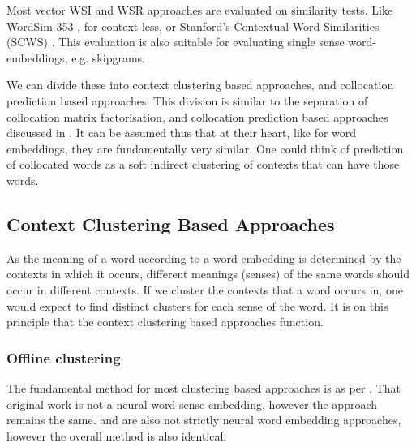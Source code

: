 \documentclass[12pt,parskip]{komatufte}
\begin{document}
Most vector WSI and WSR approaches are evaluated on similarity tests.
Like WordSim-353 \textcite{WordSim353}, for context-less, or Stanford's Contextual Word Similarities (SCWS) \textcite{Huang2012}.
This evaluation is also suitable for evaluating single sense word-embeddings, e.g. skipgrams.


We can divide these into context clustering based approaches,
and collocation prediction based approaches.
This division is similar to the separation of collocation matrix factorisation,
and collocation prediction based approaches discussed in .
It can be assumed thus that at their heart, like for word embeddings,
they are fundamentally very similar.
One could think of prediction of collocated words as a soft indirect clustering of contexts that can have those words.


\subsection{Context Clustering Based Approaches}
As the meaning of a word according to a word embedding is determined by the contexts in which it occurs, different meanings (senses) of the same words should occur in different contexts.
If we cluster the contexts that a word occurs in, one would expect to find distinct clusters for each sense of the word.
It is on this principle that the context clustering based approaches function.



\subsubsection{Offline clustering}
The fundamental method for most clustering based approaches is as per .
That original work is not a neural word-sense embedding, however the approach remains the same.
 and  are also not strictly neural word embedding approaches, however the overall method is also identical.


\end{document}
